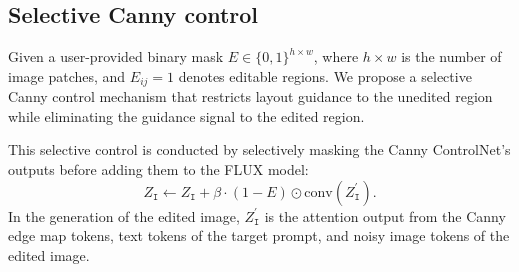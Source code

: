 \documentclass{article}
\begin{document}













\subsection{Selective Canny control}
\label{sec:cannycontrol}

Given a user-provided binary mask \( E \in \{0,1\}^{h \times w} \), where $h \times w$ is the number of image patches, and \( E_{ij} = 1 \) denotes editable regions.  We propose a selective Canny control mechanism that restricts layout guidance to the unedited region while eliminating the guidance signal to the edited region.

This selective control is conducted by selectively masking the Canny ControlNet's outputs before adding them to the FLUX model:
\begin{equation}
Z_{\texttt{I}} \gets Z_{\texttt{I}} + \beta\cdot (1-E) \odot \mathrm{conv}({Z}^{\prime}_{\texttt{I}}).
\label{eq:selective_Canny}
\end{equation}
In the generation of the edited image, ${Z}^{\prime}_{\texttt{I}}$ is the attention output from the Canny edge map tokens, text tokens of the target prompt, and noisy image tokens of the edited image. 
\end{document}
